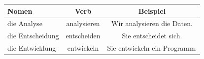 \begin{center}
\begin{tabular}{|l|c|c|}
\hline
Nomen & Verb & Beispiel \\ \hline
die Analyse & analysieren & Wir analysieren die Daten. \\ \hline
die Entscheidung & entscheiden & Sie entscheidet sich. \\ \hline
die Entwicklung & entwickeln & Sie entwickeln ein Programm. \\ \hline
\end{tabular}
\end{center}

\chapterend